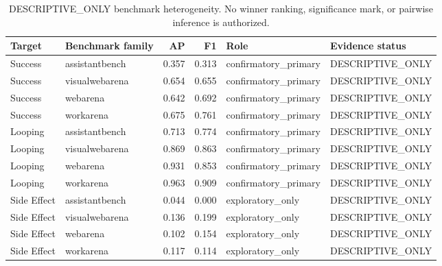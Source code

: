 \begin{table}[t]
\centering
\small
\caption{DESCRIPTIVE\_ONLY benchmark heterogeneity. No winner ranking, significance mark, or pairwise inference is authorized.}
\label{tab:benchmark-heterogeneity}
\begin{tabular}{llrrp{}p{}}
\hline
Target & Benchmark family & AP & F1 & Role & Evidence status \\
\hline
Success & assistantbench & 0.357 & 0.313 & confirmatory\_primary & DESCRIPTIVE\_ONLY \\
Success & visualwebarena & 0.654 & 0.655 & confirmatory\_primary & DESCRIPTIVE\_ONLY \\
Success & webarena & 0.642 & 0.692 & confirmatory\_primary & DESCRIPTIVE\_ONLY \\
Success & workarena & 0.675 & 0.761 & confirmatory\_primary & DESCRIPTIVE\_ONLY \\
Looping & assistantbench & 0.713 & 0.774 & confirmatory\_primary & DESCRIPTIVE\_ONLY \\
Looping & visualwebarena & 0.869 & 0.863 & confirmatory\_primary & DESCRIPTIVE\_ONLY \\
Looping & webarena & 0.931 & 0.853 & confirmatory\_primary & DESCRIPTIVE\_ONLY \\
Looping & workarena & 0.963 & 0.909 & confirmatory\_primary & DESCRIPTIVE\_ONLY \\
Side Effect & assistantbench & 0.044 & 0.000 & exploratory\_only & DESCRIPTIVE\_ONLY \\
Side Effect & visualwebarena & 0.136 & 0.199 & exploratory\_only & DESCRIPTIVE\_ONLY \\
Side Effect & webarena & 0.102 & 0.154 & exploratory\_only & DESCRIPTIVE\_ONLY \\
Side Effect & workarena & 0.117 & 0.114 & exploratory\_only & DESCRIPTIVE\_ONLY \\
\hline
\end{tabular}
\end{table}
